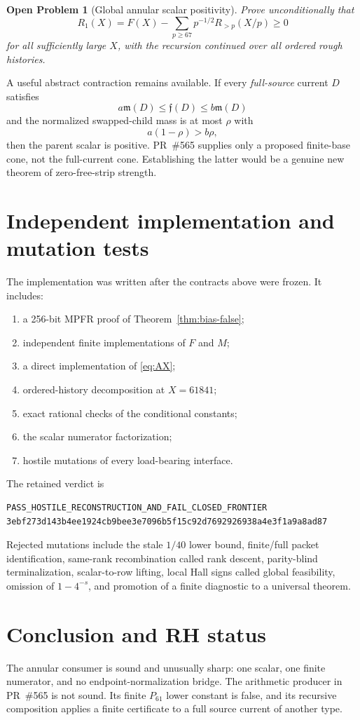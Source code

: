 \documentclass[11pt]{article}
\newtheorem{problem}[theorem]{Open Problem}
\newcommand{\Mass}{\mathfrak m}
\newcommand{\Obs}{\mathfrak f}
\begin{document}
\begin{problem}[Global annular scalar positivity]
Prove unconditionally that
\[
 R_1(X)=F(X)-\sum_{p\ge67}p^{-1/2}R_{>p}(X/p)\ge0
\]
for all sufficiently large $X$, with the recursion continued over all ordered rough histories.
\end{problem}

A useful abstract contraction remains available.  If every \emph{full-source} current $D$ satisfies
\[
 a\Mass(D)\le\Obs(D)\le b\Mass(D)
\]
and the normalized swapped-child mass is at most $\rho$ with
\[
 a(1-\rho)>b\rho,
\]
then the parent scalar is positive.  PR~\#565 supplies only a proposed finite-base cone, not the full-current cone.  Establishing the latter would be a genuine new theorem of zero-free-strip strength.

\section{Independent implementation and mutation tests}
The implementation was written after the contracts above were frozen.  It includes:
\begin{enumerate}
\item a 256-bit MPFR proof of Theorem~\ref{thm:bias-false};
\item independent finite implementations of $F$ and $M$;
\item a direct implementation of \eqref{eq:AX};
\item ordered-history decomposition at $X=61841$;
\item exact rational checks of the conditional constants;
\item the scalar numerator factorization;
\item hostile mutations of every load-bearing interface.
\end{enumerate}
The retained verdict is
\begin{lstlisting}[basicstyle=\ttfamily\small]
PASS_HOSTILE_RECONSTRUCTION_AND_FAIL_CLOSED_FRONTIER
3ebf273d143b4ee1924cb9bee3e7096b5f15c92d7692926938a4e3f1a9a8ad87
\end{lstlisting}

Rejected mutations include the stale $1/40$ lower bound, finite/full packet identification, same-rank recombination called rank descent, parity-blind terminalization, scalar-to-row lifting, local Hall signs called global feasibility, omission of $1-4^{-s}$, and promotion of a finite diagnostic to a universal theorem.

\section{Conclusion and RH status}
The annular consumer is sound and unusually sharp: one scalar, one finite numerator, and no endpoint-normalization bridge.  The arithmetic producer in PR~\#565 is not sound.  Its finite $P_{61}$ lower constant is false, and its recursive composition applies a finite certificate to a full source current of another type.
\end{document}
